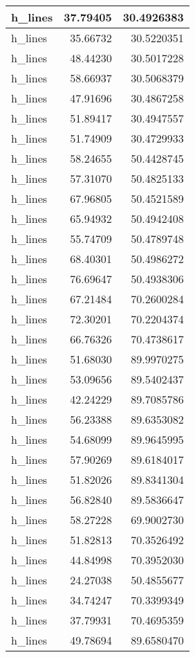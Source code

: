 \documentclass[
]{book}
\theoremstyle{definition}
\theoremstyle{definition}
\theoremstyle{definition}
\theoremstyle{definition}
\theoremstyle{remark}
\begin{document}
\begin{tabular}{l|r|r}
\hline
h\_lines & 37.79405 & 30.4926383\\
\hline
h\_lines & 35.66732 & 30.5220351\\
\hline
h\_lines & 48.44230 & 30.5017228\\
\hline
h\_lines & 58.66937 & 30.5068379\\
\hline
h\_lines & 47.91696 & 30.4867258\\
\hline
h\_lines & 51.89417 & 30.4947557\\
\hline
h\_lines & 51.74909 & 30.4729933\\
\hline
h\_lines & 58.24655 & 50.4428745\\
\hline
h\_lines & 57.31070 & 50.4825133\\
\hline
h\_lines & 67.96805 & 50.4521589\\
\hline
h\_lines & 65.94932 & 50.4942408\\
\hline
h\_lines & 55.74709 & 50.4789748\\
\hline
h\_lines & 68.40301 & 50.4986272\\
\hline
h\_lines & 76.69647 & 50.4938306\\
\hline
h\_lines & 67.21484 & 70.2600284\\
\hline
h\_lines & 72.30201 & 70.2204374\\
\hline
h\_lines & 66.76326 & 70.4738617\\
\hline
h\_lines & 51.68030 & 89.9970275\\
\hline
h\_lines & 53.09656 & 89.5402437\\
\hline
h\_lines & 42.24229 & 89.7085786\\
\hline
h\_lines & 56.23388 & 89.6353082\\
\hline
h\_lines & 54.68099 & 89.9645995\\
\hline
h\_lines & 57.90269 & 89.6184017\\
\hline
h\_lines & 51.82026 & 89.8341304\\
\hline
h\_lines & 56.82840 & 89.5836647\\
\hline
h\_lines & 58.27228 & 69.9002730\\
\hline
h\_lines & 51.82813 & 70.3526492\\
\hline
h\_lines & 44.84998 & 70.3952030\\
\hline
h\_lines & 24.27038 & 50.4855677\\
\hline
h\_lines & 34.74247 & 70.3399349\\
\hline
h\_lines & 37.79931 & 70.4695359\\
\hline
h\_lines & 49.78694 & 89.6580470\\

\end{tabular}
\end{document}
